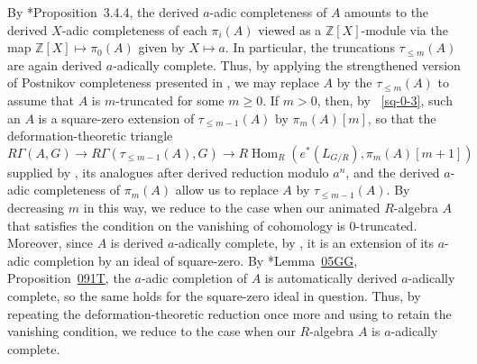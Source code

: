 \documentclass[11pt, reqno]{amsart}
\newcommand{\bZ}{\mathbb{Z}}
\DeclareMathOperator{\Hom}{Hom}		%
\newcommand{\ra}{\rightarrow}
\numberwithin{equation}{numberingbase}
\theoremstyle{thms}
\theoremstyle{claims}
\theoremstyle{defs}
\theoremstyle{thms}
\theoremstyle{defs}
\theoremstyle{subsection-tweak}
\theoremstyle{subsection-tweak}
\begin{document}
By \cite{BS15}*{Proposition~3.4.4}, the derived $a$-adic completeness of $A$ amounts to the derived $X$-adic completeness of each $\pi_i(A)$ viewed as a $\bZ[X]$-module via the map $\bZ[X] \mapsto \pi_0(A)$ given by $X \mapsto a$. In particular, the truncations $\tau_{\le m}(A)$ are again derived $a$-adically complete. Thus, by applying the strengthened version of Postnikov completeness presented in , we may replace $A$ by the $\tau_{\le m}(A)$ to assume that $A$ is $m$-truncated for some $m \ge 0$. If $m > 0$, then, by ~\ref{sq-0-3}, such an $A$ is a square-zero extension of $\tau_{\le m - 1}(A)$ by $\pi_m(A)[m]$, so that the deformation-theoretic triangle
\[
R\Gamma(A, G) \ra R\Gamma(\tau_{\le m - 1}(A), G) \ra R\Hom_R(e^*(L_{G/R}), \pi_m(A)[m + 1])
\]
supplied by , its analogues after derived reduction modulo $a^n$, and the derived $a$-adic completeness of $\pi_m(A)$ allow us to replace $A$ by $\tau_{\le m - 1}(A)$. By decreasing $m$ in this way, we reduce to the case when our animated $R$-algebra $A$ that satisfies the condition on the vanishing of cohomology is $0$-truncated. Moreover, since $A$ is derived $a$-adically complete, by , it is an extension of its $a$-adic completion by an ideal of square-zero. By \cite{SP}*{Lemma~\href{https://stacks.math.columbia.edu/tag/05GG}{05GG}, Proposition~\href{https://stacks.math.columbia.edu/tag/091T}{091T}}, the $a$-adic completion of $A$ is automatically derived $a$-adically complete, so the same holds for the square-zero ideal in question. Thus, by repeating the deformation-theoretic reduction once more and using  to retain the vanishing condition, we reduce to the case when our $R$-algebra $A$ is $a$-adically complete. 
\end{document}
